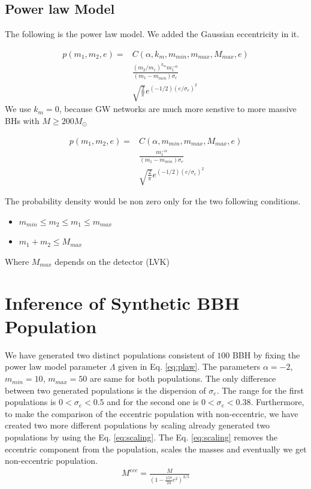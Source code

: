 \documentclass[twocolumn,prd,nofootinbib]{revtex4}
\begin{document}
\subsection{Power law Model}
The following is the power law model. We added the Gaussian eccentricity in it. 

\begin{align}
\label{eq:plawg}
p(m_1,m_2,e) = &C(\alpha,k_m,m_{min},m_{max},M_{max},e)  
\nonumber \\ & \frac{(m_2/m_1)^{k_m}m_1^{-\alpha}}{(m_1-m_{min})\sigma_e} 
\nonumber \\ &
\sqrt{\frac{2}{\pi}} e^{(-1/2)(e/\sigma_e)^2}
\end{align}
We use $k_m=0$, because GW networks are much more senstive to more massive BHs with $M\geq 200 M_\odot$

\begin{align}
\label{eq:plaw}
p(m_1,m_2,e) = &C(\alpha,m_{min},m_{max},M_{max},e)  
\nonumber \\ & \frac{m_1^{-\alpha}}{(m_1-m_{min})\sigma_e} 
\nonumber \\ &
\sqrt{\frac{2}{\pi}} e^{(-1/2)(e/\sigma_e)^2}
\end{align}

The probability density would be non zero only for the two following conditions.

\begin{itemize}
    \item $m_{min}\leq m_2 \leq m_1 \leq m_{max}$
    \item $m_1+m_2 \leq M_{max}$
\end{itemize}
Where $M_{max}$ depends on the detector (LVK)

   
\section{Inference of Synthetic BBH Population}
We have generated two distinct populations consistent of $100$ BBH by fixing the power law model parameter $\Lambda$ given in Eq. \ref{eq:plaw}. 
The parameters $\alpha=-2$, $m_{min}=10$, $m_{max}=50$ are same for both populations. The only difference between two generated populations is the dispersion of $\sigma_e$. The range for the first populations is $0<\sigma_e<0.5$ and for the second one is $0<\sigma_e<0.38$.
Furthermore, to make the comparison of the eccentric population with non-eccentric, we have created two more different populations by scaling already generated two populations by using the Eq. \ref{eq:scaling}. The Eq. \ref{eq:scaling} removes the eccentric component from the population, scales the masses and eventually we get non-eccentric population.
\begin{align}
\label{eq:scaling}
M^{ecc} = \frac{M}{(1-\frac{157}{24}e^2)^{3/5}}
\end{align}
\end{document}
